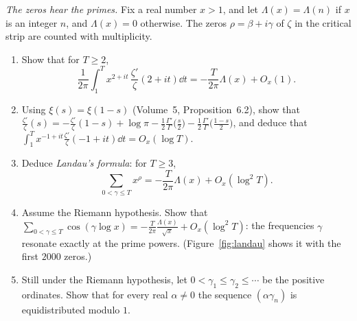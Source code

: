 \begin{exercise}[Journey]\label{pb:landauzeros}
\emph{The zeros hear the primes.} Fix a real number $x>1$, and let $\Lambda(x)=\Lambda(n)$ if $x$ is an integer $n$, and $\Lambda(x)=0$ otherwise. The zeros
$\rho=\beta+i\gamma$ of $\zeta$ in the critical strip are counted with multiplicity.
\begin{enumerate}[label=(\alph*)]
\item Show that for $T\ge2$,
\[
\frac1{2\pi}\int_1^Tx^{2+it}\,\frac{\zeta'}\zeta(2+it)\dd t=-\frac T{2\pi}\Lambda(x)+O_x(1).
\]
\item Using $\xi(s)=\xi(1-s)$ (Volume~5, Proposition~6.2), show that
$\frac{\zeta'}\zeta(s)=-\frac{\zeta'}\zeta(1-s)+\log\pi-\frac12\frac{\Gamma'}\Gamma\bigl(\frac s2\bigr)-\frac12\frac{\Gamma'}\Gamma\bigl(\frac{1-s}2\bigr)$, and deduce that
$\int_1^Tx^{-1+it}\frac{\zeta'}\zeta(-1+it)\dd t=O_x(\log T)$.
\item Deduce \emph{Landau's formula}: for $T\ge3$,
\[
\sum_{0<\gamma\le T}x^\rho=-\frac T{2\pi}\Lambda(x)+O_x(\log^2T).
\]
\item Assume the Riemann hypothesis. Show that $\sum_{0<\gamma\le T}\cos(\gamma\log x)=-\frac T{2\pi}\frac{\Lambda(x)}{\sqrt x}+O_x(\log^2T)$: the frequencies $\gamma$
resonate exactly at the prime powers. (Figure~\ref{fig:landau} shows it with the first $2000$ zeros.)
\item Still under the Riemann hypothesis, let $0<\gamma_1\le\gamma_2\le\cdots$ be the positive ordinates. Show that for every real $\alpha\ne0$ the sequence
$(\alpha\gamma_n)$ is equidistributed modulo $1$.
\end{enumerate}
\end{exercise}

